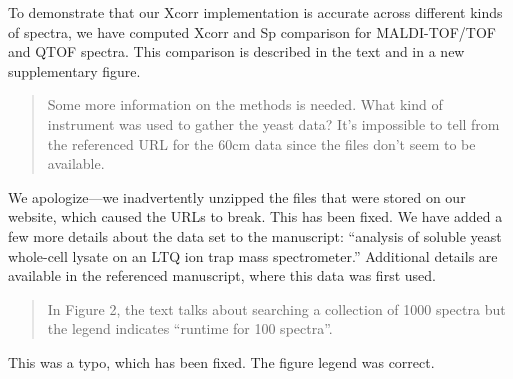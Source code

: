 \documentclass{article}
\newcommand{\breview}{\begin{quotation}\begin{em}\noindent}
\newcommand{\ereview}{\end{em}\end{quotation}}
\begin{document}
To demonstrate that our Xcorr implementation is accurate across
different kinds of spectra, we have computed Xcorr and Sp comparison
for MALDI-TOF/TOF and QTOF spectra.  This comparison is described in the
text and in a new supplementary figure. 

\breview Some more information on the methods is needed. What kind of
instrument was used to gather the yeast data? It's impossible to tell
from the referenced URL for the 60cm data since the files don't seem
to be available. \ereview

We apologize---we inadvertently unzipped the files that were stored on
our website, which caused the URLs to break.  This has been fixed.  We
have added a few more details about the data set to the manuscript:
``analysis of soluble yeast whole-cell lysate on an LTQ ion trap mass
spectrometer.''  Additional details are available in the referenced
manuscript, where this data was first used.

\breview In Figure 2, the text talks about searching a collection of
1000 spectra but the legend indicates ``runtime for 100
spectra''. \ereview

This was a typo, which has been fixed.  The figure legend was correct.
\end{document}
